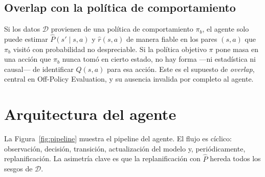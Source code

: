 \documentclass[12pt, a4paper]{article}
\theoremstyle{plain}
\theoremstyle{definition}
\newcommand{\pibeh}{\pi_b}
\newcommand{\Phat}{\widehat{P}}
\newcommand{\rhat}{\widehat{r}}
\begin{document}
\subsection{Overlap con la política de comportamiento}

Si los datos $\mathcal{D}$ provienen de una política de comportamiento
$\pibeh$, el agente solo puede estimar $\Phat(s'\mid s,a)$ y
$\rhat(s,a)$ de manera fiable en los pares $(s,a)$ que $\pibeh$ visitó
con probabilidad no despreciable. Si la política objetivo $\pi$ pone
masa en una acción que $\pibeh$ nunca tomó en cierto estado, no hay
forma ---ni estadística ni causal--- de identificar $Q(s,a)$ para esa
acción. Este es el supuesto de \emph{overlap}, central en Off-Policy
Evaluation, y su ausencia invalida por completo al agente.

\section{Arquitectura del agente}
\label{sec:arquitectura}

La Figura~\ref{fig:pipeline} muestra el pipeline del agente. El flujo es
cíclico: observación, decisión, transición, actualización del modelo y,
periódicamente, replanificación. La asimetría clave es que la
replanificación con $\Phat$ hereda todos los sesgos de $\mathcal{D}$.
\end{document}
